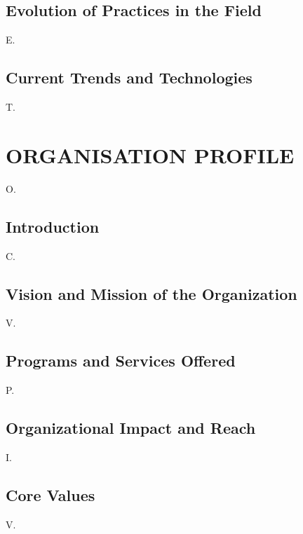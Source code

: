 \documentclass[12pt,a4paper]{report}
\begin{document}
\section{Evolution of Practices in the Field}

E.


\section{Current Trends and Technologies}

T.




\chapter{ORGANISATION PROFILE}


O.


\section{Introduction}

C.




\section{Vision and Mission of the Organization}

V.


\section{Programs and Services Offered}

P.


\section{Organizational Impact and Reach}

I.


\section{Core Values}

V.




\end{document}
